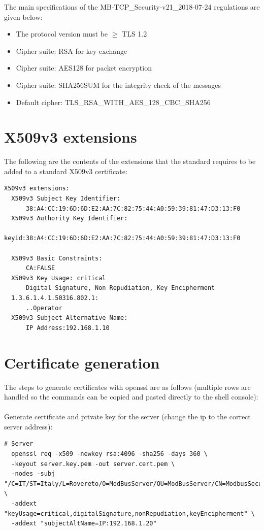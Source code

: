 The main specifications of the MB-TCP\_Security-v21\_2018-07-24 regulations are given below:

\begin{itemize}
    \item The protocol version must be $\ge$ TLS 1.2
    \item Cipher suite: RSA for key exchange
    \item Cipher suite: AES128 for packet encryption
    \item Cipher suite: SHA256SUM for the integrity check of the messages
    \item Default cipher: TLS\_RSA\_WITH\_AES\_128\_CBC\_SHA256
\end{itemize}

\section{X509v3 extensions}

The following are the contents of the extensions that the standard requires 
to be added to a standard X509v3 certificate:

\begin{verbatim}
X509v3 extensions:
  X509v3 Subject Key Identifier:
      38:A4:CC:19:6D:6D:E2:AA:7C:82:75:44:A0:59:39:81:47:D3:13:F0
  X509v3 Authority Key Identifier:
      keyid:38:A4:CC:19:6D:6D:E2:AA:7C:82:75:44:A0:59:39:81:47:D3:13:F0

  X509v3 Basic Constraints:
      CA:FALSE
  X509v3 Key Usage: critical
      Digital Signature, Non Repudiation, Key Encipherment
  1.3.6.1.4.1.50316.802.1:
      ..Operator
  X509v3 Subject Alternative Name:
      IP Address:192.168.1.10
\end{verbatim}

\newpage
\section{Certificate generation}

The steps to generate certificates with openssl are as follows (multiple rows are handled so the 
commands can be copied and pasted directly to the shell console):
\\\\
Generate certificate and private key for the server (change the ip to the correct server address):

\begin{verbatim}
# Server
  openssl req -x509 -newkey rsa:4096 -sha256 -days 360 \
  -keyout server.key.pem -out server.cert.pem \
  -nodes -subj "/C=IT/ST=Italy/L=Rovereto/O=ModBusServer/OU=ModBusServer/CN=ModbusSecurityServer" \
  -addext "keyUsage=critical,digitalSignature,nonRepudiation,keyEncipherment" \
  -addext "subjectAltName=IP:192.168.1.20"
\end{verbatim}

